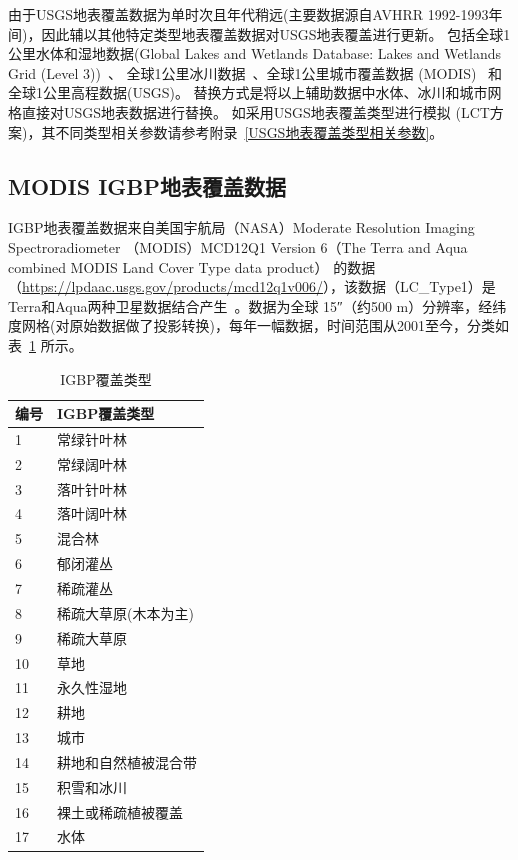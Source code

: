 由于USGS地表覆盖数据为单时次且年代稍远(主要数据源自AVHRR 1992-1993年间)，因此辅以其他特定类型地表覆盖数据对USGS地表覆盖进行更新。
包括全球1公里水体和湿地数据(Global Lakes and Wetlands Database: Lakes and Wetlands Grid (Level 3))~\citep{lehner2004development}、
全球1公里冰川数据~\citep{RGIConsortium2017}、全球1公里城市覆盖数据 (MODIS)~\citep{schneider2009new} 和全球1公里高程数据(USGS)。
替换方式是将以上辅助数据中水体、冰川和城市网格直接对USGS地表数据进行替换。
如采用USGS地表覆盖类型进行模拟 (LCT方案)，其不同类型相关参数请参考附录~\ref{USGS地表覆盖类型相关参数}。

\subsection{MODIS IGBP地表覆盖数据}\label{IGBP地表覆盖数据}
IGBP地表覆盖数据来自美国宇航局（NASA）Moderate Resolution Imaging Spectroradiometer 
（MODIS）MCD12Q1 Version 6（The Terra and Aqua combined MODIS Land Cover Type data product）
的数据（\url{https://lpdaac.usgs.gov/products/mcd12q1v006/}），该数据（LC\_Type1）是Terra和Aqua两种卫星数据结合产生~\citep{Friedl2019}。数据为全球 \ang{;;15}（约500 m）分辨率，经纬度网格(对原始数据做了投影转换)，每年一幅数据，时间范围从2001至今，分类如表~\ref{tab:IGBP覆盖类型} 所示。

\begin{table}[htbp]
\centering
\caption{IGBP覆盖类型}
\label{tab:IGBP覆盖类型}
\begin{tabular}{@{}ll@{}}
\toprule
编号 & IGBP覆盖类型     \\ \midrule
1  & 常绿针叶林           \\
2  & 常绿阔叶林      \\
3  & 落叶针叶林     \\
4  & 落叶阔叶林 \\
5  & 混合林     \\
6  & 郁闭灌丛      \\
7  & 稀疏灌丛           \\
8  & 稀疏大草原(木本为主)         \\
9  & 稀疏大草原     \\
10 & 草地         \\
11 & 永久性湿地        \\
12 & 耕地        \\
13 & 城市        \\
14 & 耕地和自然植被混合带        \\
15 & 积雪和冰川        \\
16 & 裸土或稀疏植被覆盖       \\ 
17 & 水体           \\ \bottomrule
\end{tabular}
\end{table}

